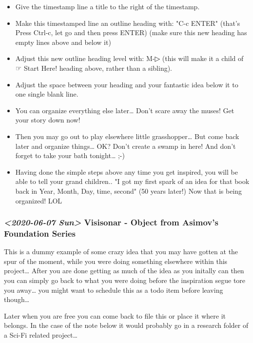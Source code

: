 \documentclass[11pt]{article}
\begin{document}
\begin{itemize}
\begin{itemize}
\item Give the timestamp line a title to the right of the timestamp.

\item Make this timestamped line an outline heading with: "C-c ENTER" (that's Press Ctrl-c, let go and then press ENTER)
(make sure this new heading has empty lines above and below it)

\item Adjust this new outline heading level with: M-▷ (this will make it a child of ☞ Start Here! heading above, rather than a sibling).

\item Adjust the space between your heading and your fantastic idea below it to one single blank line.

\item You can organize everything else later\ldots{}  Don't scare away the muses! Get your story down now!

\item Then you may go out to play elsewhere little grasshopper\ldots{} But come back later and organize things\ldots{} OK? Don't create a swamp in here! And don't forget to take your bath tonight\ldots{} ;-)

\item Having done the simple steps above any time you get inspired, you will be able to tell your grand children.. "I got my first spark of an idea for that book back in Year, Month, Day, time, second" (50 years later!) Now that is being organized! LOL
\end{itemize}
\end{itemize}

\subsubsection{\textit{<2020-06-07 Sun> } Visisonar - Object from Asimov's Foundation Series}
\label{sec:org6948d4c}

This is a dummy example of some crazy idea that you may have gotten at the spur of the moment, while you were doing something elsewhere within this project\ldots{}  After you are done getting as much of the idea as you initally can then you can simply go back to what you were doing before the inspiration segue tore you away\ldots{} you might want to schedule this as a todo item before leaving though\ldots{}

Later when you are free you can come back to file this or place it where it belongs.  In the case of the note below it would probably go in a research folder of a Sci-Fi related project\ldots{}
\end{document}
